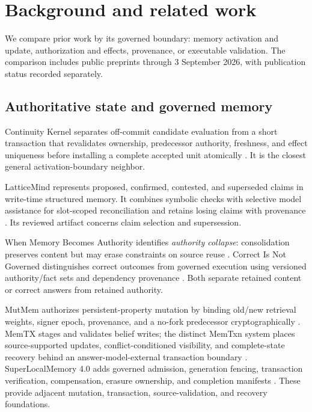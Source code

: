 \section{Background and related work}
\label{sec:related}

We compare prior work by its governed boundary: memory activation and update, authorization and effects, provenance, or executable validation. The comparison includes public preprints through 3 September 2026, with publication status recorded separately.

\subsection{Authoritative state and governed memory}

Continuity Kernel separates off-commit candidate evaluation from a short transaction that revalidates ownership, predecessor authority, freshness, and effect uniqueness before installing a complete accepted unit atomically \citep{he2026continuity}. It is the closest general activation-boundary neighbor.

LatticeMind represents proposed, confirmed, contested, and superseded claims in write-time structured memory. It combines symbolic checks with selective model assistance for slot-scoped reconciliation and retains losing claims with provenance \citep{zhou2026latticemind}. Its reviewed artifact concerns claim selection and supersession.

When Memory Becomes Authority identifies \emph{authority collapse}: consolidation preserves content but may erase constraints on source reuse \citep{zhan2026authoritycollapse}. Correct Is Not Governed distinguishes correct outcomes from governed execution using versioned authority/fact sets and dependency provenance \citep{salas2026governed}. Both separate retained content or correct answers from retained authority.

MutMem authorizes persistent-property mutation by binding old/new retrieval weights, signer epoch, provenance, and a no-fork predecessor cryptographically \citep{saidi2026mutmem}. MemTX stages and validates belief writes; the distinct MemTxn system places source-supported updates, conflict-conditioned visibility, and complete-state recovery behind an answer-model-external transaction boundary \citep{li2026memtx,cui2026memtxn}. SuperLocalMemory 4.0 adds governed admission, generation fencing, transaction verification, compensation, erasure ownership, and completion manifests \citep{bhardwaj2026superlocalmemory}. These provide adjacent mutation, transaction, source-validation, and recovery foundations.

